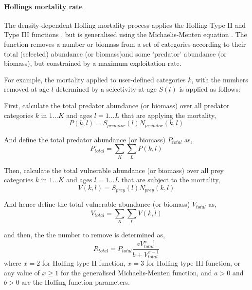 \paragraph{Hollings mortality rate}

The density-dependent Holling mortality process applies the Holling Type II and Type III functions \citep{Holling1959}, but is generalised using the Michaelis-Menten equation \citep{MentenMichaelis1913}. The function removes a number or biomass from a set of categories according to their total (selected) abundance (or biomass)and some 'predator' abundance (or biomass), but constrained by a maximum exploitation rate.

For example, the mortality applied to user-defined categories $k$, with the numbers removed at age $l$ determined by a selectivity-at-age $S(l)$ is applied as follows:

First, calculate the total predator abundance (or biomass) over all predator categories $k$ in $1 \ldots K$ and ages $l = 1 \ldots L$ that are applying the mortality,
\begin{equation}
	P(k,l) = S_{predator}(l) N_{predator}(k,l)
\end{equation}

And define the total predator abundance (or biomass) $P_{total}$ as,
\begin{equation}
	P_{total}  = \sum\limits_K {\sum\limits_L {P(k,l)}} 
\end{equation}

Then, calculate the total vulnerable abundance (or biomass) over all prey categories $k$ in $1 \ldots K$ and ages $l = 1 \ldots L$ that are subject to the mortality,
\begin{equation}
	V(k,l) = S_{prey}(l) N_{prey}(k,l)
\end{equation}

And hence define the total vulnerable abundance (or biomass) $V_{total}$ as,
\begin{equation}
	V_{total}  = \sum\limits_K {\sum\limits_L {V(k,l)}} 
\end{equation}

and then, the the number to remove is determined as,
\begin{equation}
	R_{total} = P_{total} \frac{a  V_{total}^{x-1}}{b + V_{total}^{x-1}}
\end{equation}
where $x=2$ for Holling type II function,  $x=3$ for Holling type III function, or any value of $x \geq 1$ for the generalised Michaelis-Menten function, and $a > 0$ and $b > 0$ are the Holling function parameters.

